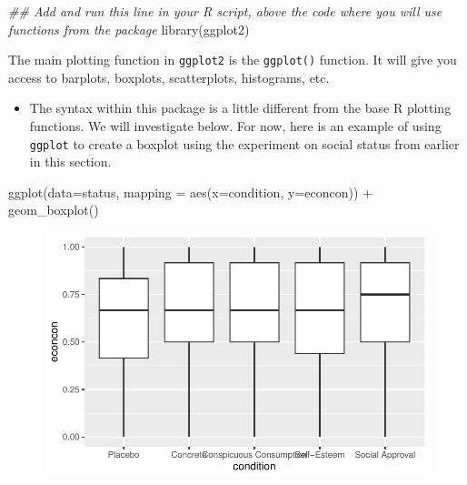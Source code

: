 \documentclass[
  letterpaper,
  DIV=11,
  numbers=noendperiod]{scrreprt}
\newenvironment{Shaded}{\begin{snugshade}}{\end{snugshade}}
\newcommand{\AttributeTok}[1]{\textcolor[rgb]{0.40,0.45,0.13}{#1}}
\newcommand{\DocumentationTok}[1]{\textcolor[rgb]{0.37,0.37,0.37}{\textit{#1}}}
\newcommand{\FunctionTok}[1]{\textcolor[rgb]{0.28,0.35,0.67}{#1}}
\newcommand{\NormalTok}[1]{\textcolor[rgb]{0.00,0.23,0.31}{#1}}
\newcommand{\SpecialCharTok}[1]{\textcolor[rgb]{0.37,0.37,0.37}{#1}}
\providecommand{\tightlist}{%
  \setlength{\itemsep}{0pt}\setlength{\parskip}{0pt}}\usepackage{longtable,booktabs,array}
\begin{document}
\begin{Shaded}
\begin{Highlighting}[]
\DocumentationTok{\#\# Add and run this line in your R script, above the code where you will use functions from the package}
\FunctionTok{library}\NormalTok{(ggplot2)}
\end{Highlighting}
\end{Shaded}

The main plotting function in \texttt{ggplot2} is the \texttt{ggplot()}
function. It will give you access to barplots, boxplots, scatterplots,
histograms, etc.

\begin{itemize}
\tightlist
\item
  The syntax within this package is a little different from the base R
  plotting functions. We will investigate below. For now, here is an
  example of using \texttt{ggplot} to create a boxplot using the
  experiment on social status from earlier in this section.
\end{itemize}

\begin{Shaded}
\begin{Highlighting}[]
\FunctionTok{ggplot}\NormalTok{(}\AttributeTok{data=}\NormalTok{status, }\AttributeTok{mapping =} \FunctionTok{aes}\NormalTok{(}\AttributeTok{x=}\NormalTok{condition, }\AttributeTok{y=}\NormalTok{econcon)) }\SpecialCharTok{+}
  \FunctionTok{geom\_boxplot}\NormalTok{()}
\end{Highlighting}
\end{Shaded}

\begin{figure}[H]

{\centering \includegraphics{04-Visualization_files/figure-pdf/unnamed-chunk-46-1.pdf}

}

\end{figure}
\end{document}
